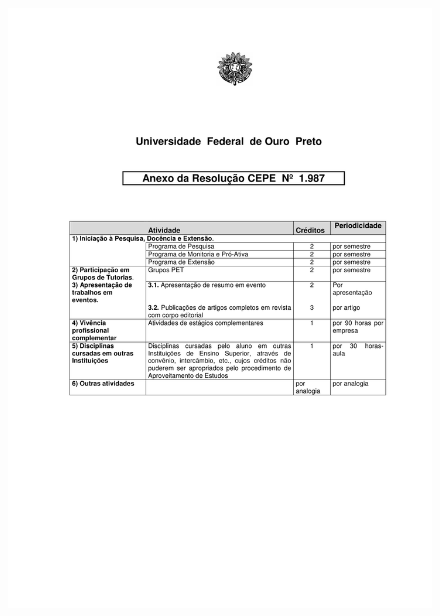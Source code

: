 \begin{figure}[p]
	\centering 
	\includegraphics[scale=0.7]{capitulos/resolucoes/cepe1987/cepe1987-4.pdf}
\end{figure} \pagebreak

